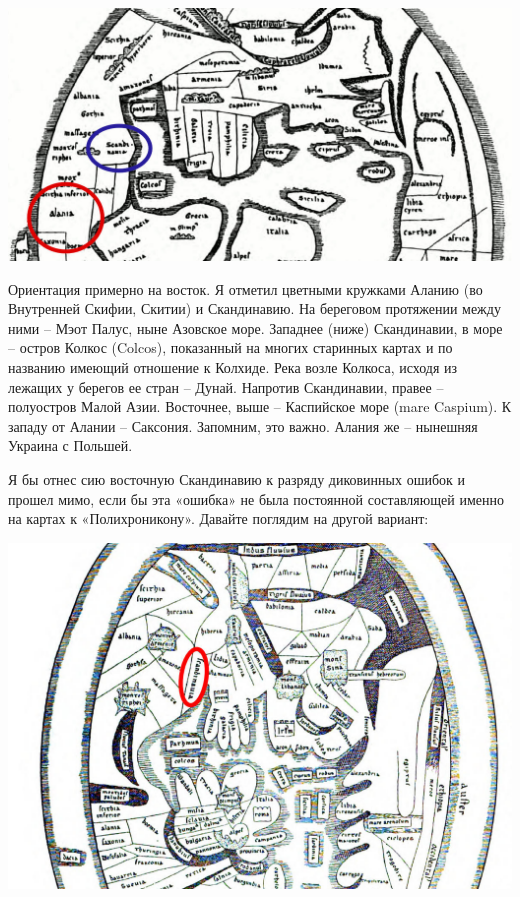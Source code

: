 \begin{center}
\includegraphics[width=\linewidth]{chast-colebanie-osnov/okartah/scand-01.jpg}
\end{center}

Ориентация примерно на восток. Я отметил цветными кружками Аланию (во Внутренней Скифии, Скитии) и Скандинавию. На береговом протяжении между ними – Мэот Палус, ныне Азовское море. Западнее (ниже) Скандинавии, в море – остров Колкос (Colcos), показанный на многих старинных картах и по названию имеющий отношение к Колхиде. Река возле Колкоса, исходя из лежащих у берегов ее стран – Дунай. Напротив Скандинавии, правее – полуостров Малой Азии. Восточнее, выше – Каспийское море (mare Caspium). К западу от Алании – Саксония. Запомним, это важно. Алания же – нынешняя Украина с Польшей.

Я бы отнес сию восточную Скандинавию к разряду диковинных ошибок и прошел мимо, если бы эта «ошибка» не была постоянной составляющей именно на картах к «Полихроникону». Давайте поглядим на другой вариант:

\begin{center}
\includegraphics[width=\linewidth]{chast-colebanie-osnov/okartah/scand-02.jpg}
\end{center}

